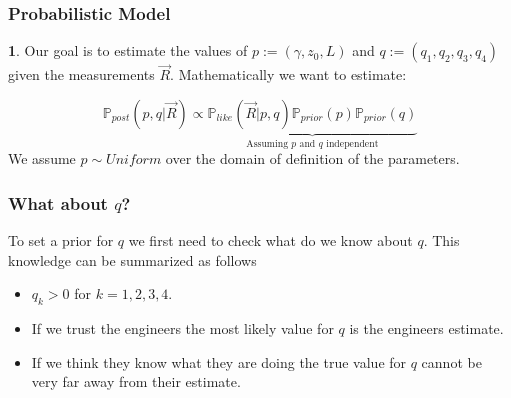 \documentclass[11pt]{beamer}
\theoremstyle{plain}
\theoremstyle{definition}
\newtheorem{dfn}{}[section]
\newcommand{\p}{\mathbb{P}}
\newcommand{\like}{\p_{like}}
\newcommand{\prior}{\p_{prior}}
\newcommand{\post}{\p_{post}}
\begin{document}
\begin{frame}
\frametitle{Probabilistic Model}

\begin{dfn}
Our goal is to estimate the values of $p:=(\gamma,z_{0},L)$ and 
$q:=(q_{1},q_{2},q_{3},q_{4})$ given the measurements
$\vec{R}$. Mathematically we want to estimate:

\begin{equation*}
\post(p,q|\vec{R})\propto
\underbrace{\like(\vec{R}|p,q)\prior(p)\prior(q)}_{\text{Assuming $p$ and $q$ independent}}
\end{equation*}
We assume $p\sim Uniform$ over the domain of definition of the parameters.
 
\end{dfn}
\end{frame}

\begin{frame}
\frametitle{What about $q$?}
To set a prior for $q$ we first need to check what do we know about $q$. This knowledge can be 
summarized as follows
\begin{itemize}
\item $q_{k}>0$ for $k=1,2,3,4$.
\item If we trust the engineers the most likely value for $q$ is the engineers estimate.
\item If we think they know what they are doing the true value for $q$ cannot be very far away from their
estimate.
\end{itemize}
\end{frame}
\end{document}
